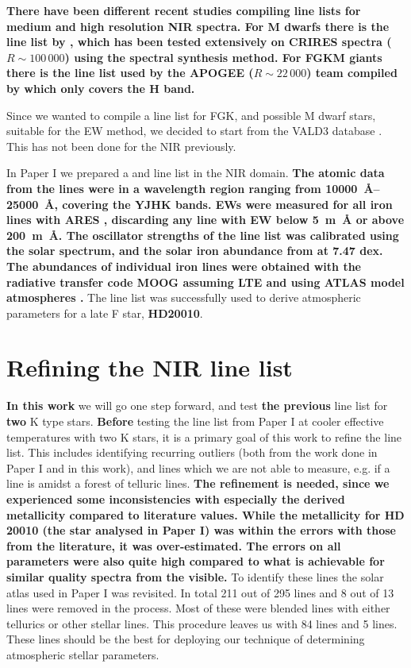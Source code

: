 \documentclass{aa}
\begin{document}
{\bf There have been different recent studies compiling line lists for medium
and high resolution NIR spectra. For M dwarfs there is the line list by
\citet{Onehag2012,Lindgren2016}, which has been tested extensively on CRIRES
spectra ($R\sim100\,000$) using the spectral synthesis method. For FGKM giants
there is the line list used by the APOGEE ($R\sim22\,000$) team compiled by
\citet{Shetrone2015} which only covers the H band.

Since we wanted to compile a line list for FGK, and possible M dwarf stars,
suitable for the EW method, we decided to start from the VALD3 database
\citep{VALD1,VALD2}. This has not been done for the NIR previously.} In Paper I
we prepared a  and  line list in the NIR domain. {\bf The
atomic data from the lines were in a wavelength region ranging from
\SIrange{10000}{25000}{\AA}, covering the YJHK bands. EWs were measured for all
iron lines with ARES \citep{Sousa2015a}, discarding any line with EW below
\SI{5}{m\AA} or above \SI{200}{m\AA}. The oscillator strengths of the line list
was calibrated using the solar spectrum, and the solar iron abundance from
\citet{Gonzalez2000} at 7.47 dex. The abundances of individual iron lines were
obtained with the radiative transfer code MOOG \citep{Sneden1973} assuming LTE
and using ATLAS model atmospheres \citep{Kurucz1993}.} The line list was
successfully used to derive atmospheric parameters for a late F star, {\bf
HD20010}.


\section{Refining the NIR line list}
\label{sec:refining_the_line_list}

{\bf In this work} we will go one step forward, and test {\bf the previous} line
list for {\bf two} K type stars. {\bf Before} testing the line list from Paper I
at cooler effective temperatures with two K stars, it is a primary goal of this
work to refine the line list. This includes identifying recurring outliers (both
from the work done in Paper I and in this work), and lines which we are not able
to measure, e.g. if a line is amidst a forest of telluric lines. {\bf The
refinement is needed, since we experienced some inconsistencies with especially
the derived metallicity compared to literature values. While the metallicity for
HD 20010 (the star analysed in Paper I) was within the errors with those from
the literature, it was over-estimated. The errors on all parameters were also
quite high compared to what is achievable for similar quality spectra from the
visible.} To identify these lines the solar atlas used in Paper I was revisited.
In total 211 out of 295  lines and 8 out of 13  lines
were removed in the process. Most of these were blended lines with either
tellurics or other stellar lines. This procedure leaves us with 84 
lines and 5  lines. These lines should be the best for deploying our
technique of determining atmospheric stellar parameters.
\end{document}
